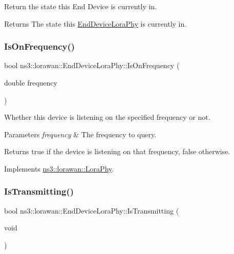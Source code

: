 Return the state this End Device is currently in.

\begin{DoxyReturn}{Returns}
The state this \hyperlink{classns3_1_1lorawan_1_1EndDeviceLoraPhy}{End\+Device\+Lora\+Phy} is currently in. 
\end{DoxyReturn}
\mbox{\label{classns3_1_1lorawan_1_1EndDeviceLoraPhy_a70a83e7dde5b2ae33f6f47dbbf4ad0cd}} 
\subsubsection{\texorpdfstring{Is\+On\+Frequency()}{IsOnFrequency()}}
{\footnotesize\ttfamily bool ns3\+::lorawan\+::\+End\+Device\+Lora\+Phy\+::\+Is\+On\+Frequency (\begin{DoxyParamCaption}\item[{double}]{frequency }\end{DoxyParamCaption})\hspace{0.3cm}{\ttfamily [virtual]}}

Whether this device is listening on the specified frequency or not.


\begin{DoxyParams}{Parameters}
{\em frequency} & The frequency to query. \\
\hline
\end{DoxyParams}
\begin{DoxyReturn}{Returns}
true if the device is listening on that frequency, false otherwise. 
\end{DoxyReturn}


Implements \hyperlink{classns3_1_1lorawan_1_1LoraPhy_a554597e30a17b099e8a7f68242cb16a7}{ns3\+::lorawan\+::\+Lora\+Phy}.

\mbox{\label{classns3_1_1lorawan_1_1EndDeviceLoraPhy_a3925d5a27b7e1352c04a78f008071d23}} 
\subsubsection{\texorpdfstring{Is\+Transmitting()}{IsTransmitting()}}
{\footnotesize\ttfamily bool ns3\+::lorawan\+::\+End\+Device\+Lora\+Phy\+::\+Is\+Transmitting (\begin{DoxyParamCaption}\item[{void}]{ }\end{DoxyParamCaption})\hspace{0.3cm}{\ttfamily [virtual]}}

